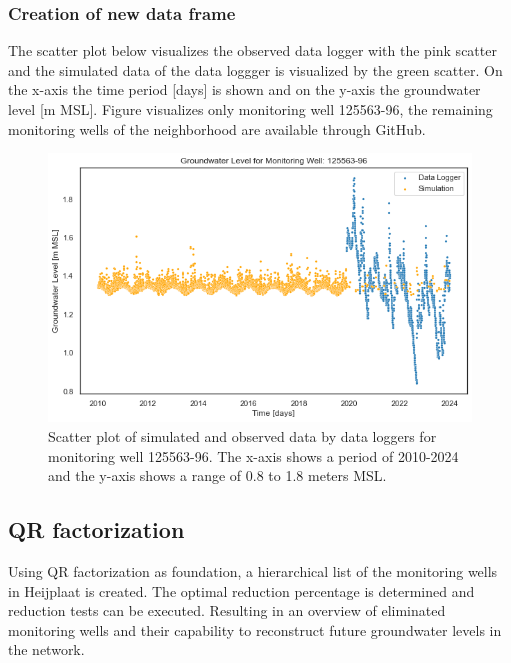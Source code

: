 \subsubsection{Creation of new data frame}
The scatter plot below visualizes the observed data logger with the pink scatter and the simulated data of the data loggger is visualized by the green scatter. On the x-axis the time period [days] is shown and on the y-axis the groundwater level [m MSL]. Figure  visualizes only monitoring well 125563-96, the remaining monitoring wells of the neighborhood are available through GitHub.


\begin{figure}[htbp]
    \centering
    \includegraphics[width=0.80\linewidth]{frontmatter/Heijplaat-fig/scattercombi12556396.png}
    \caption{Scatter plot of simulated and observed data by data loggers for monitoring well 125563-96. The x-axis shows a period of 2010-2024 and the y-axis shows a range of 0.8 to 1.8 meters MSL.}  
    \label{scatterheij}
\end{figure}


\subsection{QR factorization}
Using QR factorization as foundation, a hierarchical list of the monitoring wells in Heijplaat is created. The optimal reduction percentage is determined and reduction tests can be executed. Resulting in an overview of eliminated monitoring wells and their capability to reconstruct future groundwater levels in the network.

